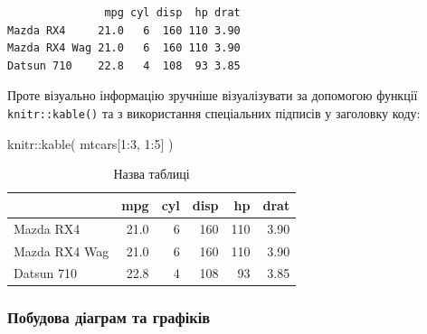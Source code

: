 \documentclass[
  letterpaper,
  DIV=11,
  numbers=noendperiod]{scrartcl}
\newenvironment{Shaded}{\begin{snugshade}}{\end{snugshade}}
\newcommand{\DecValTok}[1]{\textcolor[rgb]{0.68,0.00,0.00}{#1}}
\newcommand{\FunctionTok}[1]{\textcolor[rgb]{0.28,0.35,0.67}{#1}}
\newcommand{\NormalTok}[1]{\textcolor[rgb]{0.00,0.23,0.31}{#1}}
\newcommand{\SpecialCharTok}[1]{\textcolor[rgb]{0.37,0.37,0.37}{#1}}
\begin{document}
\begin{verbatim}
               mpg cyl disp  hp drat
Mazda RX4     21.0   6  160 110 3.90
Mazda RX4 Wag 21.0   6  160 110 3.90
Datsun 710    22.8   4  108  93 3.85
\end{verbatim}

Проте візуально інформацію зручніше візуалізувати за допомогою функції
\texttt{knitr::kable()} та з використання спеціальних підписів у
заголовку коду:

\begin{Shaded}
\begin{Highlighting}[numbers=left,,]
\NormalTok{knitr}\SpecialCharTok{::}\FunctionTok{kable}\NormalTok{(}
\NormalTok{  mtcars[}\DecValTok{1}\SpecialCharTok{:}\DecValTok{3}\NormalTok{, }\DecValTok{1}\SpecialCharTok{:}\DecValTok{5}\NormalTok{]}
\NormalTok{)}
\end{Highlighting}
\end{Shaded}

\begin{table}

\caption{Назва таблиці}\begin{minipage}[t]{\linewidth}

{\centering 

\begin{tabular}[t]{lrrrrr}
\toprule
 & mpg & cyl & disp & hp & drat\\
\midrule
Mazda RX4 & 21.0 & 6 & 160 & 110 & 3.90\\
Mazda RX4 Wag & 21.0 & 6 & 160 & 110 & 3.90\\
Datsun 710 & 22.8 & 4 & 108 & 93 & 3.85\\
\bottomrule
\end{tabular}

}

\end{minipage}%

\end{table}

\hypertarget{ux43fux43eux431ux443ux434ux43eux432ux430-ux434ux456ux430ux433ux440ux430ux43c-ux442ux430-ux433ux440ux430ux444ux456ux43aux456ux432}{%
\subsubsection{Побудова діаграм та
графіків}\label{ux43fux43eux431ux443ux434ux43eux432ux430-ux434ux456ux430ux433ux440ux430ux43c-ux442ux430-ux433ux440ux430ux444ux456ux43aux456ux432}}
\end{document}
